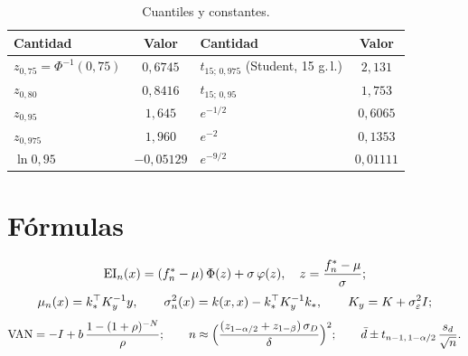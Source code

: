 \begin{table}[h]
\centering\small
\caption{Cuantiles y constantes.}\label{tab:cuantiles}
\begin{tabular}{@{}lc@{\qquad}lc@{}}
\toprule
Cantidad & Valor & Cantidad & Valor \\
\midrule
$z_{0{,}75}=\Phi^{-1}(0{,}75)$ & $0{,}6745$ & $t_{15;\,0{,}975}$ (Student, 15 g.\,l.) & $2{,}131$ \\
$z_{0{,}80}$ & $0{,}8416$ & $t_{15;\,0{,}95}$ & $1{,}753$ \\
$z_{0{,}95}$ & $1{,}645$ & $e^{-1/2}$ & $0{,}6065$ \\
$z_{0{,}975}$ & $1{,}960$ & $e^{-2}$ & $0{,}1353$ \\
$\ln 0{,}95$ & $-0{,}05129$ & $e^{-9/2}$ & $0{,}01111$ \\
\bottomrule
\end{tabular}
\end{table}

\section*{Fórmulas}
\[
\mathrm{EI}_n(x)=(f^{\ast}_{n}-\mu)\,\Phi(z)+\sigma\,\varphi(z),\quad z=\frac{f^{\ast}_{n}-\mu}{\sigma};
\]
\[
\mu_n(x)=k_\ast^{\top} K_y^{-1}y,\qquad \sigma_n^2(x)=k(x,x)-k_\ast^{\top} K_y^{-1}k_\ast,\qquad K_y=K+\sigma_\varepsilon^{2}I ;
\]
\[
\mathrm{VAN}=-I+b\,\frac{1-(1+\rho)^{-N}}{\rho};\qquad
n\approx\Bigl(\frac{(z_{1-\alpha/2}+z_{1-\beta})\,\sigma_D}{\delta}\Bigr)^{2};\qquad
\bar d\pm t_{n-1,\,1-\alpha/2}\,\frac{s_d}{\sqrt n}.
\]
